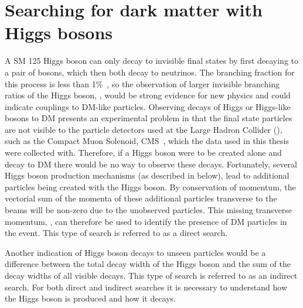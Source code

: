 \section{Searching for dark matter with Higgs bosons}
\label{sec:higgsdm}
A \ac{SM} 125 \GeV Higgs boson can only decay to invisible final states by first decaying to a pair of \PZ bosons, which then both decay to neutrinos. The branching fraction for this process is less than 1\%~\cite{Heinemeyer:1559921}, so the observation of larger invisible branching ratios of the Higgs boson, \BRinv, would be strong evidence for new physics and could indicate couplings to \ac{DM}-like particles. Observing decays of Higgs or Higgs-like bosons to \ac{DM} presents an experimental problem in that the final state particles are not visible to the particle detectors used at the Large Hadron Collider (\LHC), such as the Compact Muon Solenoid, CMS~\cite{Chatrchyan:2008aa}, which the data used in this thesis were collected with. Therefore, if a Higgs boson were to be created alone and decay to \ac{DM} there would be no way to observe these decays. Fortunately, several Higgs boson production mechanisms (as described in  below), lead to additional particles being created with the Higgs boson. By conservation of momentum, the vectorial sum of the momenta of these additional particles transverse to the \LHC beams will be non-zero due to the unobserved particles. This missing transverse momentum, \MET, can therefore be used to identify the presence of \ac{DM} particles in the event. This type of search is referred to as a direct search.

Another indication of Higgs boson decays to unseen particles would be a difference between the total decay width of the Higgs boson and the sum of the decay widths of all visible decays. This type of search is referred to as an indirect search. For both direct and indirect searches it is necessary to understand how the Higgs boson is produced and how it decays.

